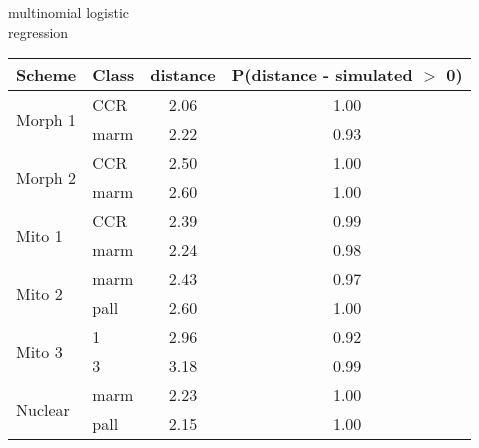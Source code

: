 \begin{subtable}[b]{0.3\textwidth}
  \caption{multinomial logistic\\regression}
  \centering
  \begin{tabular}{ l | l c c }
    \hline
    Scheme & Class & distance & P(distance - simulated \(>\) 0)\\ 
    \hline
    \hline
    \multirow{2}{*}{Morph 1} & CCR & 2.06 & 1.00 \\ 
    & marm & 2.22 & 0.93 \\ 
    \hline
    \multirow{2}{*}{Morph 2} & CCR & 2.50 & 1.00 \\ 
    & marm & 2.60 & 1.00 \\ 
    \hline
    \multirow{2}{*}{Mito 1} & CCR & 2.39 & 0.99 \\ 
    & marm & 2.24 & 0.98 \\ 
    \hline
    \multirow{2}{*}{Mito 2} & marm & 2.43 & 0.97 \\ 
    & pall & 2.60 & 1.00 \\ 
    \hline
    \multirow{2}{*}{Mito 3} & 1 & 2.96 & 0.92 \\ 
    & 3 & 3.18 & 0.99 \\ 
    \hline
    \multirow{2}{*}{Nuclear} & marm & 2.23 & 1.00 \\ 
    & pall & 2.15 & 1.00 \\ 
    \hline
  \end{tabular}
  \label{mmmiss}
\end{subtable}
